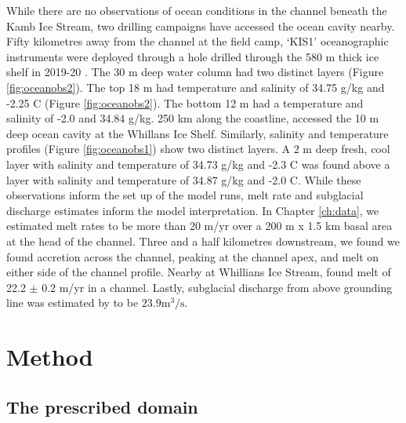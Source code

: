 While there are no observations of ocean conditions in the channel beneath the Kamb Ice Stream, two drilling campaigns have accessed the ocean cavity nearby. 
Fifty kilometres away from the channel at the field camp, `KIS1' oceanographic instruments were deployed through a hole drilled through the 580 m thick ice shelf in 2019-20 \citep{robinson2020ice}. The 30 m deep water column had two distinct layers (Figure \ref{fig:oceanobs2}). The top 18 m had temperature and salinity of 34.75 g/kg and -2.25 \textdegree C (Figure \ref{fig:oceanobs2}). The bottom 12 m had a temperature and salinity of -2.0 and 34.84 g/kg.
250 km along the coastline, \cite{begeman2018ocean} accessed the 10 m deep ocean cavity at the Whillans Ice Shelf. Similarly, salinity and temperature profiles (Figure \ref{fig:oceanobs1}) show two distinct layers. A 2 m deep fresh, cool layer with salinity and temperature of 34.73 g/kg and -2.3 \textdegree C was found above a layer with salinity and temperature of 34.87 g/kg and -2.0 \textdegree C.
While these observations inform the set up of the model runs, melt rate and subglacial discharge estimates inform the model interpretation.
In Chapter \ref{ch:data}, we estimated melt rates to be more than 20 m/yr over a 200 m x 1.5 km basal area at the head of the channel. Three and a half kilometres downstream, we found we found accretion across the channel, peaking at the channel apex, and melt on either side of the channel profile. Nearby at Whillians Ice Stream, \cite{marsh2016high} found melt of 22.2 $\pm$ 0.2 m/yr in a channel. Lastly, subglacial discharge from above grounding line was estimated by \cite{le2009subglacial} to be $23.9 \mathrm{m}^3/\mathrm{s}$.


\section{Method}

\subsection{The prescribed domain} \label{sec:domain}


